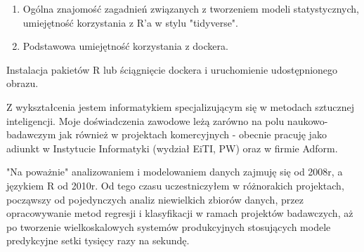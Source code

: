 \documentclass[\main/boa.tex]{subfiles}
\begin{document}
\umiejetnosci\begin{enumerate}
	\item Ogólna znajomość zagadnień związanych z tworzeniem modeli statystycznych, umiejętność korzystania z R'a w stylu "tidyverse". 
	\item Podstawowa umiejętność korzystania z dockera.
\end{enumerate}

\wymagania Instalacja pakietów R lub ściągnięcie dockera i uruchomienie udostępnionego obrazu.

\sylwetkaprowadzacego Z wykształcenia jestem informatykiem specjalizującym się w metodach sztucznej inteligencji. Moje doświadczenia zawodowe leżą zarówno na polu naukowo-badawczym jak również w projektach komercyjnych - obecnie pracuję jako adiunkt w Instytucie Informatyki (wydział EiTI, PW) oraz w firmie Adform.

"Na poważnie" analizowaniem i modelowaniem danych zajmuję się od 2008r, a językiem R od 2010r. Od tego czasu uczestniczyłem w różnorakich projektach, począwszy od pojedynczych analiz niewielkich zbiorów danych, przez opracowywanie metod regresji i klasyfikacji w ramach projektów badawczych, aż po tworzenie wielkoskalowych systemów produkcyjnych stosujących modele predykcyjne setki tysięcy razy na sekundę.
\end{document}
